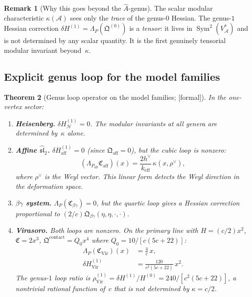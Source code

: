 \documentclass[11pt,oneside]{memoir}
\numberwithin{equation}{chapter}
\newtheorem{theorem}{Theorem}[chapter]
\theoremstyle{definition}
\newtheorem{remark}[theorem]{Remark}
\newcommand{\ClaimStatusProvedHere}{\textnormal{[formal]}}
\newcommand{\cA}{\mathcal A}
\begin{document}
\begin{remark}[Why this goes beyond the $\hat{A}$-genus]
\label{rem:nms-beyond-ahat}
The scalar modular characteristic $\kappa(\cA)$ sees only the \emph{trace} of the genus-$0$ Hessian.  The genus-$1$ Hessian correction $\delta H^{(1)}=\Lambda_P(\mathfrak Q^{(0)})$ is a \emph{tensor}: it lives in $\operatorname{Sym}^2(V_{\cA}^*)$ and is not determined by any scalar quantity.  It is the first genuinely tensorial modular invariant beyond~$\kappa$.
\end{remark}

\subsection{Explicit genus loop for the model families}
\label{subsec:nms-explicit-genus-loop}

\begin{theorem}[Genus loop operator on the model families; \ClaimStatusProvedHere]
\label{thm:nms-genus-loop-model-families}
In the one-vertex sector:
\begin{enumerate}[label=\textup{(\roman*)}]
\item \textbf{Heisenberg.}
$\delta H^{(1)}_{\mathcal H}=0$.
The modular invariants at all genera are determined by~$\kappa$ alone.

\item \textbf{Affine $\widehat{\mathfrak{sl}}_2$.}
$\delta H^{(1)}_{\mathrm{aff}}=0$ (since $\mathfrak Q_{\mathrm{aff}}=0$), but the cubic loop is nonzero:
\begin{equation}
\label{eq:nms-affine-cubic-loop}
(\Lambda_{P_{\mathrm{aff}}}\mathfrak C_{\mathrm{aff}})(x)
=
\frac{2h^\vee}{k_{\mathrm{eff}}}\,\kappa(x,\rho^\vee),
\end{equation}
where $\rho^\vee$ is the Weyl vector.  This linear form detects the Weyl direction in the deformation space.

\item \textbf{$\beta\gamma$ system.}
$\Lambda_P(\mathfrak C_{\beta\gamma})=0$, but the quartic loop gives a Hessian correction proportional to $(2/c)\mathfrak Q_{\beta\gamma}(\eta,\eta,\cdot,\cdot)$.

\item \textbf{Virasoro.}
Both loops are nonzero.  On the primary line with $H=(c/2)x^2$, $\mathfrak C=2x^3$, $\mathfrak Q^{\mathrm{contact}}=Q_0 x^4$ where $Q_0=10/[c(5c+22)]$:
\begin{align}
\Lambda_P(\mathfrak C_{\mathrm{Vir}})(x)
&=
\frac{4}{c}\,x,
\label{eq:nms-virasoro-cubic-loop}
\\
\delta H^{(1)}_{\mathrm{Vir}}
&=
\frac{120}{c^2(5c+22)}\,x^2.
\label{eq:nms-virasoro-hessian-correction}
\end{align}
The genus-$1$ loop ratio is $\rho^{(1)}_{\mathrm{Vir}}=\delta H^{(1)}/H^{(0)}=240/[c^2(5c+22)]$, a nontrivial rational function of~$c$ that is not determined by $\kappa=c/2$.
\end{enumerate}
\end{theorem}
\end{document}
